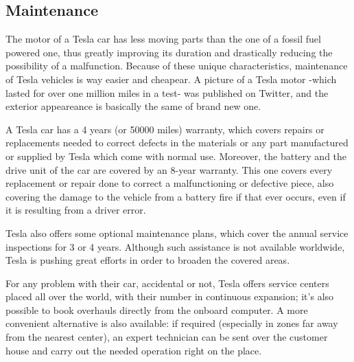 \subsection{Maintenance}

The motor of a Tesla car has less moving parts than the one of a fossil fuel powered one, thus greatly improving its duration and drastically reducing the possibility of a malfunction. Because of these unique characteristics, maintenance of Tesla vehicles is way easier and cheapear. A picture of a Tesla motor -which lasted for over one million miles in a test- was published on Twitter, and the exterior appeareance is basically the same of brand new one\cite{tesla1mMiles}.

A Tesla car has a 4 years (or 50000 miles) warranty, which covers repairs or replacements needed to correct defects in the materials or any part manufactured or supplied by Tesla which come with normal use. Moreover, the battery and the drive unit of the car are covered by an 8-year warranty. This one covers every replacement or repair done to correct a malfunctioning or defective piece, also covering the damage to the vehicle from a battery fire if that ever occurs, even if it is resulting from a driver error\cite{teslaWarranty}. 

Tesla also offers some optional maintenance plans, which cover the annual service inspections for 3 or 4 years. Although such assistance is not available worldwide, Tesla is pushing great efforts in order to broaden the covered areas. 

For any problem with their car, accidental or not, Tesla offers service centers placed all over the world, with their number in continuous expansion; it's also possible to book overhauls directly from the onboard computer. A more convenient alternative is also available: if required (especially in zones far away from the nearest center), an expert technician can be sent over the customer house and carry out the needed operation right on the place.